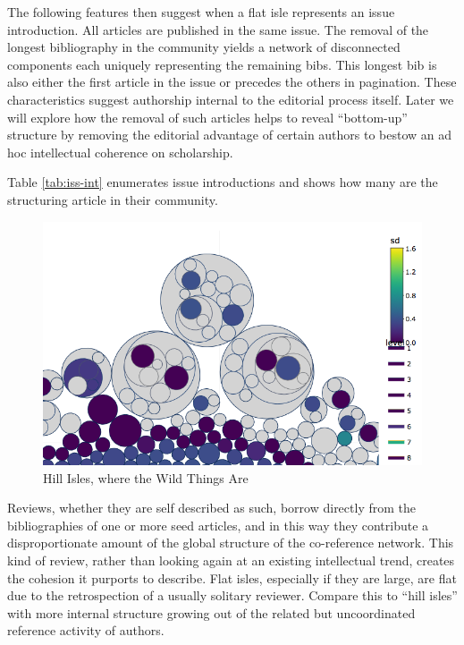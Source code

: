\documentclass[]{book}
\theoremstyle{definition}
\theoremstyle{definition}
\theoremstyle{definition}
\theoremstyle{remark}
\begin{document}
The following features then suggest when a flat isle represents an issue
introduction. All articles are published in the same issue. The removal
of the longest bibliography in the community yields a network of
disconnected components each uniquely representing the remaining bibs.
This longest bib is also either the first article in the issue or
precedes the others in pagination. These characteristics suggest
authorship internal to the editorial process itself. Later we will
explore how the removal of such articles helps to reveal ``bottom-up''
structure by removing the editorial advantage of certain authors to
bestow an ad hoc intellectual coherence on scholarship.

Table \ref{tab:iss-int} enumerates issue introductions and shows how
many are the structuring article in their community.

\begin{figure}

{\centering \includegraphics[width=0.9\linewidth]{img/hill-isle} 

}

\caption{Hill Isles, where the Wild Things Are}\label{fig:hill-isle}
\end{figure}

Reviews, whether they are self described as such, borrow directly from
the bibliographies of one or more seed articles, and in this way they
contribute a disproportionate amount of the global structure of the
co-reference network. This kind of review, rather than looking again at
an existing intellectual trend, creates the cohesion it purports to
describe. Flat isles, especially if they are large, are flat due to the
retrospection of a usually solitary reviewer. Compare this to ``hill
isles'' with more internal structure growing out of the related but
uncoordinated reference activity of authors.
\end{document}
